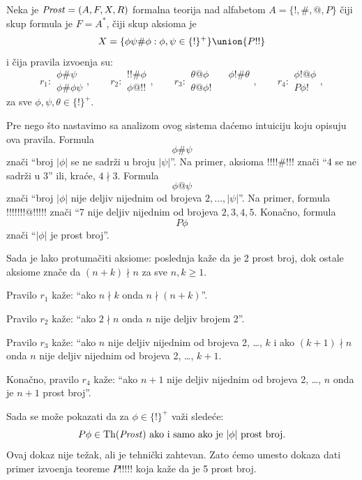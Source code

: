 Neka je $\mathit{Prost} = (A, F, X, R)$ formalna teorija nad alfabetom $A = \{!, \#, @, P\}$ \v ciji skup formula je
$F = A^*$, \v ciji skup aksioma je
$$
  X = \{\phi \psi \# \phi : \phi, \psi \in \{!\}^+\} \union \{P!!\}
$$
i \v cija pravila izvo\dj enja su:
$$
  r_1 : \begin{array}{c}
    \phi \# \psi \\ \hline
    \phi \# \phi\psi
  \end{array}, \qquad
  r_2 : \begin{array}{c}
    !! \# \phi \\ \hline
    \phi @ !!
  \end{array},\qquad
  r_3 : \begin{array}{c}
    \theta @ \phi \qquad \phi! \# \theta\\ \hline
    \theta @ \phi!
  \end{array},\qquad
  r_4 : \begin{array}{c}
    \phi! @ \phi \\ \hline
    P\phi!
  \end{array},
$$
za sve $\phi, \psi, \theta \in \{!\}^+$.

Pre nego \v sto nastavimo sa analizom ovog sistema da\'cemo intuiciju koju opisuju ova pravila.
Formula
$$
  \phi \# \psi
$$
zna\v ci ``broj $|\phi|$ se ne sadr\v zi u broju $|\psi|$''.
Na primer, aksioma $!!!!\#!!!$ zna\v ci ``4 se ne sadr\v zi u 3'' ili, kra\'ce, $4 \nmid 3$.
Formula
$$
  \phi @ \psi
$$
zna\v ci ``broj $|\phi|$ nije deljiv nijednim od brojeva $2, \ldots, |\psi|$''.
Na primer, formula $!!!!!!!@!!!!!$ zna\v ci ``7 nije deljiv nijednim od brojeva $2, 3, 4, 5$. Kona\v cno, formula
$$
  P\phi
$$
zna\v ci ``$|\phi|$ je prost broj''.

Sada je lako protuma\v citi aksiome: poslednja ka\v ze da je 2 prost broj, dok ostale aksiome zna\v ce da $(n + k) \nmid n$
za sve $n, k \ge 1$.

Pravilo $r_1$ ka\v ze: ``ako $n \nmid k$ onda $n \nmid (n + k)$''.

Pravilo $r_2$ ka\v ze: ``ako $2 \nmid n$ onda $n$ nije deljiv brojem 2''.

Pravilo $r_3$ ka\v ze: ``ako $n$ nije deljiv nijednim od brojeva 2, \ldots, $k$ i ako $(k + 1) \nmid n$ onda
$n$ nije deljiv nijednim od brojeva 2, \ldots, $k + 1$.

Kona\v cno, pravilo $r_4$ ka\v ze: ``ako $n + 1$ nije deljiv nijednim od brojeva 2, \ldots, $n$ onda je $n + 1$ prost broj''.

Sada se mo\v ze pokazati da za $\phi \in \{!\}^+$ va\v zi slede\'ce:
$$
  P\phi \in \mathrm{Th}(\mathit{Prost}) \text{ ako i samo ako je } |\phi| \text{ prost broj}.
$$
Ovaj dokaz nije te\v zak, ali je tehni\v cki zahtevan. Zato \'cemo umesto dokaza dati primer izvo\dj enja teoreme
$P!!!!!$ koja ka\v ze da je 5 prost broj.

